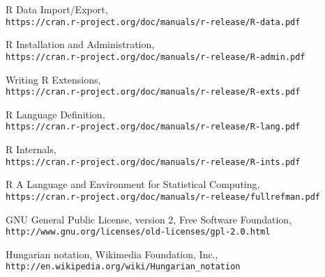 \documentclass[runningheads,14pt,a4paper,openany]{book}
\begin{document}
\begin{thebibliography}{99}
 R Data Import/Export, \\\texttt{https://cran.r-project.org/doc/manuals/r-release/R-data.pdf}

 R Installation and Administration, \\\texttt{https://cran.r-project.org/doc/manuals/r-release/R-admin.pdf}

 Writing R Extensions, \\\texttt{https://cran.r-project.org/doc/manuals/r-release/R-exts.pdf}

 R Language Definition, \\\texttt{https://cran.r-project.org/doc/manuals/r-release/R-lang.pdf}

 R Internals, \\\texttt{https://cran.r-project.org/doc/manuals/r-release/R-ints.pdf}

 R A Language and Environment for Statistical Computing, \\\texttt{https://cran.r-project.org/doc/manuals/r-release/fullrefman.pdf}

 GNU General Public License, version 2, Free Software Foundation, \\\texttt{http://www.gnu.org/licenses/old-licenses/gpl-2.0.html}

 Hungarian notation, Wikimedia Foundation, Inc., \\\texttt{http://en.wikipedia.org/wiki/Hungarian\_notation}

\end{thebibliography}

\newpage
\printindex


\end{document}
